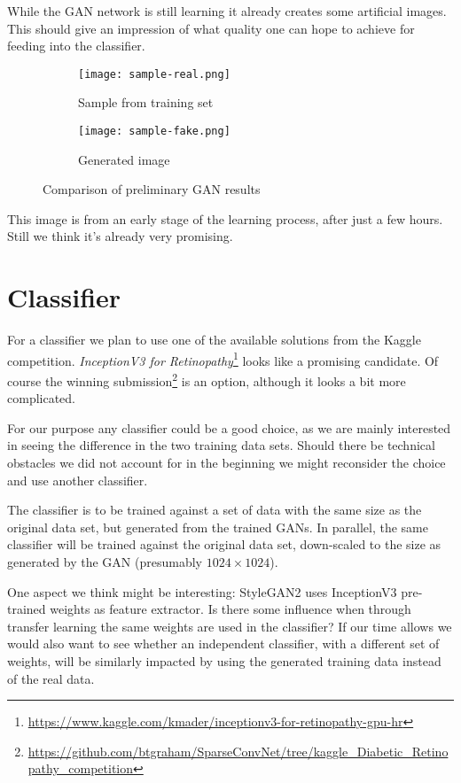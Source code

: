 \documentclass[sigconf,nonacm]{acmart}
\begin{document}
While the GAN network is still learning it already creates some
artificial images. This should give an impression of what quality
one can hope to achieve for feeding into the classifier.

\begin{figure}[H]
\centering
\begin{subfigure}{0.45\linewidth}
\centering
\texttt{[image: sample-real.png]}
\caption{Sample from training set}
\end{subfigure}
\begin{subfigure}{0.45\linewidth}
\centering
\texttt{[image: sample-fake.png]}
\caption{Generated image}
\end{subfigure}
\caption{Comparison of preliminary GAN results}
\label{fig:gan-real-fake}
\end{figure}

This image is from an early stage of the learning process, after
just a few hours. Still we think it's already very promising.

\section{Classifier}

For a classifier we plan to use one of the available solutions from
the Kaggle competition.
\emph{InceptionV3 for Retinopathy}\footnote{\url{https://www.kaggle.com/kmader/inceptionv3-for-retinopathy-gpu-hr}} looks like a promising candidate.
Of course the winning
submission\footnote{\url{https://github.com/btgraham/SparseConvNet/tree/kaggle_Diabetic_Retinopathy_competition}}
is an option, although it looks a bit more complicated.

For our purpose any classifier could be a good choice, as we are
mainly interested in seeing the difference in the two training data
sets.
Should there be technical obstacles we did not account
for in the beginning we might
reconsider the choice and use another classifier.

The classifier is to be trained against a set of data with the same
size as the original data set, but generated from the trained GANs.
In parallel, the same classifier will be trained against
the original data set, down-scaled to the size as generated by the
GAN (presumably $1024\times1024$).

One aspect we think might be interesting:
StyleGAN2 uses InceptionV3 pre-trained
weights as feature extractor. Is there some influence when
through transfer learning the same weights
are used in the classifier?
If our time allows we would also want to see whether an independent
classifier, with a different set of weights, will be
similarly impacted by using the generated training data instead
of the real data.
\end{document}
